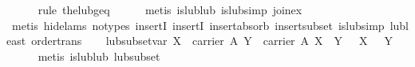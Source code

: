 \begin{isabellebody}
\ \ \ \ \isamarkupfalse%
\ {}rule\ the{}lub{}geq{}\isanewline
\ \ \ \ \isamarkupfalse%
\ {}metis\ is{}lub{}lub\ is{}lub{}simp\ join{}ex{}\isanewline
\ \ \ \ \isamarkupfalse%
\ {}metis\ {}hide{}lams{}\ no{}types{}\ insertI{}\ insertI{}\ insert{}absorb\ insert{}subset\ is{}lub{}simp\ lub{}least\ order{}trans{}%
\endisatagproof
{\isafoldproof}%
%
\isadelimproof
\isanewline
%
\endisadelimproof
\isanewline
\ \ \isamarkupfalse%
\ lub{}subset{}var{}\ {}{}X\ {}\ carrier\ A{}\ Y\ {}\ carrier\ A{}\ X\ {}\ Y{}\ {}\ {}\ X\ {}\ {}\ Y{}\isanewline
%
\isadelimproof
\ \ \ \ %
\endisadelimproof
%
\isatagproof
{}\isamarkupfalse%
\ {}metis\ is{}lub{}lub\ lub{}subset{}%
\endisatagproof
{\isafoldproof}%
%
\isadelimproof
\isanewline
%
\endisadelimproof
\isanewline
\ \ \isamarkupfalse%

\end{isabellebody}
